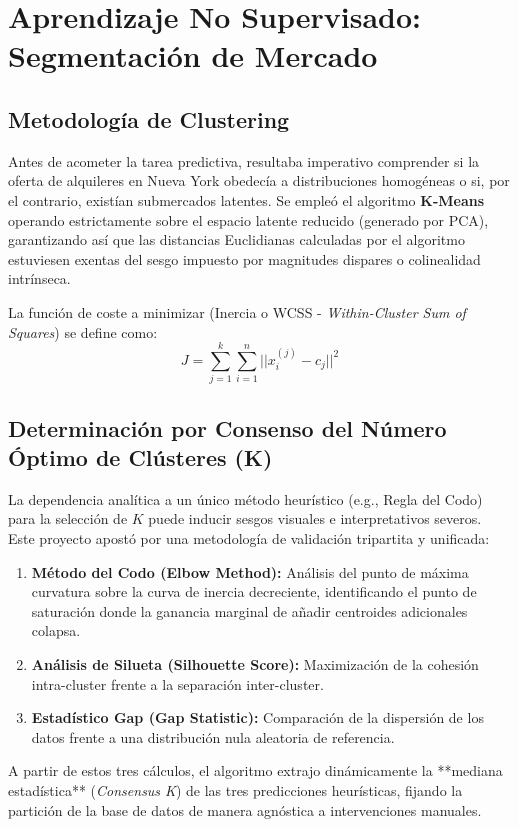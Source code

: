 \chapter{Aprendizaje No Supervisado: Segmentación de Mercado}

\section{Metodología de Clustering}
Antes de acometer la tarea predictiva, resultaba imperativo comprender si la oferta de alquileres en Nueva York obedecía a distribuciones homogéneas o si, por el contrario, existían submercados latentes. Se empleó el algoritmo \textbf{K-Means} operando estrictamente sobre el espacio latente reducido (generado por PCA), garantizando así que las distancias Euclidianas calculadas por el algoritmo estuviesen exentas del sesgo impuesto por magnitudes dispares o colinealidad intrínseca.

La función de coste a minimizar (Inercia o WCSS - \textit{Within-Cluster Sum of Squares}) se define como:
\begin{equation}
J = \sum_{j=1}^{k} \sum_{i=1}^{n} ||x_i^{(j)} - c_j||^2
\end{equation}

\section{Determinación por Consenso del Número Óptimo de Clústeres (K)}
La dependencia analítica a un único método heurístico (e.g., Regla del Codo) para la selección de $K$ puede inducir sesgos visuales e interpretativos severos. Este proyecto apostó por una metodología de validación tripartita y unificada:
\begin{enumerate}
    \item \textbf{Método del Codo (Elbow Method):} Análisis del punto de máxima curvatura sobre la curva de inercia decreciente, identificando el punto de saturación donde la ganancia marginal de añadir centroides adicionales colapsa.
    \item \textbf{Análisis de Silueta (Silhouette Score):} Maximización de la cohesión intra-cluster frente a la separación inter-cluster.
    \item \textbf{Estadístico Gap (Gap Statistic):} Comparación de la dispersión de los datos frente a una distribución nula aleatoria de referencia.
\end{enumerate}
A partir de estos tres cálculos, el algoritmo extrajo dinámicamente la **mediana estadística** (\textit{Consensus K}) de las tres predicciones heurísticas, fijando la partición de la base de datos de manera agnóstica a intervenciones manuales.

